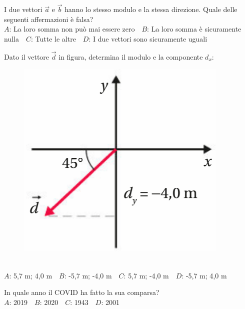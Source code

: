 \mcquestionfooter



\mcpaperfooter

\def\mcserialnumber{26}
\mcpaperheader


\def\mcquestionnumber{1}


\mcquestionheader I due vettori $\vec{a}$ e $\vec{b}$ hanno lo stesso modulo e la stessa direzione. Quale delle seguenti affermazioni è falsa?\\
{$A$}: La loro somma non può mai essere zero\ \ {$B$}: La loro somma è sicuramente nulla\ \ {$C$}: Tutte le altre\ \ {$D$}: I due vettori sono sicuramente uguali\ \ 

\mcquestionfooter



\def\mcquestionnumber{2}


\mcquestionheader Dato il vettore $\vec{d}$ in figura, determina il modulo e la componente $d_x$: \begin{figure}[h!]   \begin{center}     \includegraphics[scale=0.35]{vettored.png}   \end{center} \end{figure}\\
{$A$}: 5,7 m; 4,0 m\ \ {$B$}: -5,7 m; -4,0 m\ \ {$C$}: 5,7 m; -4,0 m\ \ {$D$}: -5,7 m; 4,0 m\ \ 

\mcquestionfooter



\def\mcquestionnumber{3}


\mcquestionheader In quale anno il COVID ha fatto la sua comparsa?\\
{$A$}: 2019\ \ {$B$}: 2020\ \ {$C$}: 1943\ \ {$D$}: 2001\ \ 

